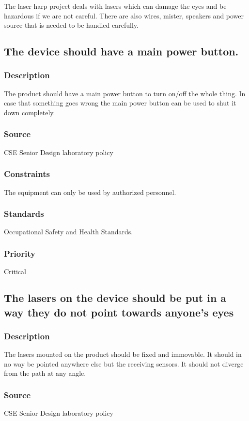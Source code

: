 The laser harp project deals with lasers which can damage the eyes and be hazardous if we are not careful. There are also wires, mister, speakers and power source that is needed to be handled carefully.

\subsection{The device should have a main power button.}
\subsubsection{Description}
The product should have a main power button to turn on/off the whole thing. In case that something goes wrong the main power button can be used to shut it down completely.
\subsubsection{Source}
CSE Senior Design laboratory policy
\subsubsection{Constraints}
The equipment can only be used by authorized personnel.
\subsubsection{Standards}
Occupational Safety and Health Standards.
\subsubsection{Priority}
Critical

\subsection{The lasers on the device should be put in a way they do not point towards anyone’s eyes}
\subsubsection{Description}
The lasers mounted on the product should be fixed and immovable. It should in no way be pointed anywhere else but the receiving sensors. It should not diverge from the path at any angle.
\subsubsection{Source}
CSE Senior Design laboratory policy
